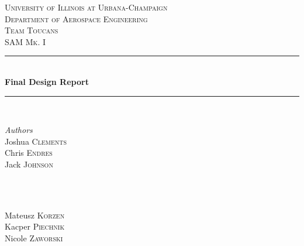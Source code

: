 
\begin{titlepage} %
	\newcommand{\HRule}{\rule{\linewidth}{0.5mm}} %
	
	\center %
	
	
	\textsc{\LARGE University of Illinois at Urbana-Champaign\\ \vspace{10pt}Department of Aerospace Engineering}\\[1.5cm] %
	
	\textsc{\Large Team Toucans}\\[0.5cm] %
	
	\textsc{\large SAM Mk. I}\\[0.5cm] %
	
	
	\HRule\\[0.4cm]
	
	{\huge\bfseries Final Design Report}\\[0.4cm] %
	
	\HRule\\[1.5cm]
	
	
	\begin{minipage}{0.4\textwidth}
		\begin{flushleft}
			\large
			\textit{Authors}\\
			Joshua \textsc{Clements}\\
			Chris \textsc{Endres}\\
			Jack \textsc{Johnson}\\
		\end{flushleft}
	\end{minipage}
	~
	\begin{minipage}{0.4\textwidth}
		\begin{flushright}
			\large
			\textit{}\\
			Mateusz \textsc{Korzen}\\
			Kacper \textsc{Piechnik}\\
			Nicole \textsc{Zaworski}
		\end{flushright}
	\end{minipage}
	

\end{titlepage}
